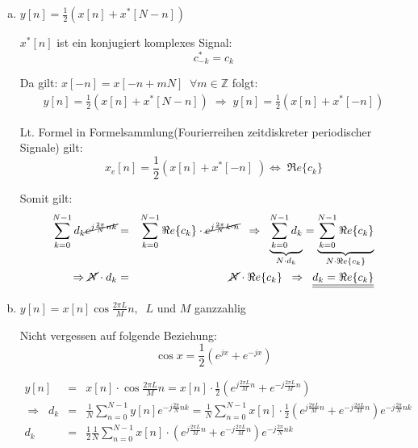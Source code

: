 \begin{uebsp}
\begin{Answer}
\begin{enumerate}[a)]
        \item $y[n]=\frac{1}{2}\left(x[n]+x^*\left[N-n\right]\right)$
            \begin{uebsp_theory}
                $x^*[n]$ ist ein konjugiert komplexes Signal:
                \[c_{-k}^*=c_k\]
            \end{uebsp_theory}
            Da gilt: $x[-n]=x[-n+mN]\;\;\forall m\in\mathbb{Z}$ folgt:
            \begin{eqnarray*}
                y[n]=\frac{1}{2}(x[n]+x^*[N-n])\;\Rightarrow\;y[n]=\frac{1}{2}(x[n]+x^*[-n])
            \end{eqnarray*}
            \begin{uebsp_theory}
                Lt. Formel in Formelsammlung(Fourierreihen zeitdiskreter periodischer Signale) gilt:
                \[x_e[n]=\frac{1}{2}\left(x[n]+x^*[-n]\;\right)\Leftrightarrow\;\Re e\{c_k\}\]
            \end{uebsp_theory}
            Somit gilt:
            \begin{eqnarray*}
                \sum_{k=0}^{N-1}d_k\cancel{e^{j\frac{2\pi}{N}nk}}&=&\sum_{k=0}^{N-1}\Re e\{c_k\}\cdot \cancel{e^{j\frac{2\pi}{N}k\cdot n}}\;\;\Rightarrow\;\;
                \underbrace{\sum_{k=0}^{N-1}d_{k}}_{N\cdot d_{k}}=\underbrace{\sum_{k=0}^{N-1}\Re e\{c_k\}}_{N\cdot \Re e\{c_k\}}\\
                \Rightarrow\cancel N\cdot d_k&=&\cancel N\cdot \Re e\{c_k\}\;\;\Rightarrow\;\;
                \underline{\underline{d_k=\Re e\{c_{k}\}}}
            \end{eqnarray*}
        \item $y[n]=x[n]\cos\frac{2\pi L}{M}n,\;\;L$ und $M$ ganzzahlig
            \begin{uebsp_theory}
                Nicht vergessen auf folgende Beziehung: \[\cos x=\frac{1}{2}\left(e^{jx}+e^{-jx}\right)\]
            \end{uebsp_theory}
            \begin{eqnarray*}
                y[n]&=&x[n]\cdot \cos\frac{2\pi L}{M}n=
                x[n]\cdot\frac{1}{2}\left(e^{j\frac{2\pi L}{M}n}+e^{-j\frac{2\pi L}{M}n}\right)\\
                \Rightarrow\;\;d_k&=&\frac{1}{N}\sum_{n=0}^{N-1}y[n]e^{-j\frac{2\pi}{N}nk}=
                \frac{1}{N}\sum_{n=0}^{N-1}x[n]\cdot\frac{1}{2}\left(e^{j\frac{2\pi L}{M}n}+e^{-j\frac{2\pi L}{M}n}\right)e^{-j\frac{2\pi}{N}nk}\\
                d_k&=&\frac{1}{2}\frac{1}{N}\sum_{n=0}^{N-1}x[n]\cdot\left(e^{j\frac{2\pi L}{M}n}+e^{-j\frac{2\pi L}{M}n}\right)e^{-j\frac{2\pi}{N}nk}\\

\end{eqnarray*}
\end{enumerate}
\end{Answer}
\end{uebsp}
